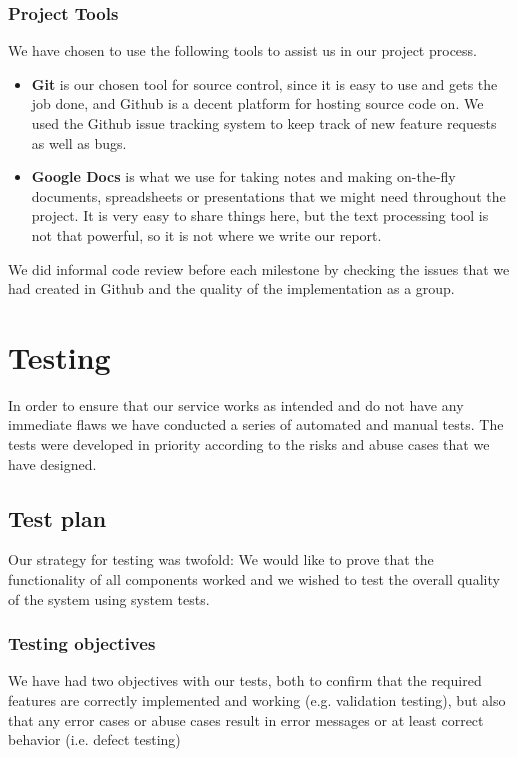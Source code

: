 \documentclass[a4paper]{article}
\begin{document}
\subsubsection{Project Tools}
We have chosen to use the following tools to assist us in our project process.
\begin{itemize}
\item \textbf{Git} is our chosen tool for source control, since it is easy to use and gets the job done, and Github is a decent platform for hosting source code on. We used the Github issue tracking system to keep track of new feature requests as well as bugs.
\item \textbf{Google Docs} is what we use for taking notes and making on-the-fly documents, spreadsheets or presentations that we might need throughout the project. It is very easy to share things here, but the text processing tool is not that powerful, so it is not where we write our report.
\end{itemize}
We did informal code review before each milestone by checking the issues that we had created in Github and the quality of the implementation as a group.

\section{Testing}\label{sec:testing}
In order to ensure that our service works as intended and do not have any immediate flaws we have conducted a series of automated and manual tests. 
The tests were developed in priority according to the risks and abuse cases that we have designed.

\subsection{Test plan}
Our strategy for testing was twofold: We would like to prove that the functionality of all components worked and we wished to test the overall quality of the system using system tests.

\subsubsection{Testing objectives}
We have had two objectives with our tests, both to confirm that the required features are correctly implemented and working (e.g. validation testing), but also that any error cases or abuse cases result in error messages or at least correct behavior (i.e. defect testing)
\end{document}
